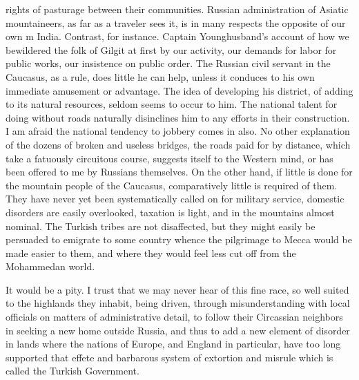 \documentclass{article}
\begin{document}
	rights of pasturage between their communities. Russian administration of Asiatic mountaineers, as far as a traveler sees it, is in many respects the opposite of our own m India. Contrast, for instance. Captain Younghusband's account of how we bewildered the folk of Gilgit at first by our activity, our demands for labor for public works, our insistence on public order. The Russian civil servant in the Caucasus, as a rule, does little he can help, unless it conduces to his own immediate amusement or advantage. The idea of developing his district, of adding to its natural resources, seldom seems to occur to him. The national talent for doing without roads naturally disinclines him to any efforts in their construction. I am afraid the national tendency to jobbery comes in also. No other explanation of the dozens of broken and useless bridges, the roads paid for by distance, which take a fatuously circuitous course, suggests itself to the Western mind, or has been offered to me by Russians themselves. On the other hand, if little is done for the mountain people of the Caucasus, comparatively little is required of them. They have never yet been systematically called on for military service, domestic disorders are easily overlooked, taxation is light, and in the mountains almost nominal. The Turkish tribes are not disaffected, but they might easily be persuaded to emigrate to some country whence the pilgrimage to Mecca would be made easier to them, and where they would feel less cut off from the Mohammedan world.
	
	It would be a pity. I trust that we may never hear of this fine race, so well suited to the highlands they inhabit, being driven, through misunderstanding with local officials on matters of administrative detail, to follow their Circassian neighbors in seeking a new home outside Russia, and thus to add a new element of disorder in lands where the nations of Europe, and England in particular, have too long supported that effete and barbarous system of extortion and misrule which is called the Turkish Government.
	
\end{document}
